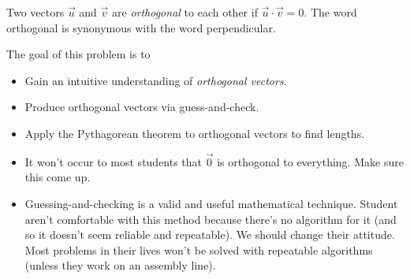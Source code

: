 \documentclass{problemset}
\begin{document}
	\begin{definition}[Orthogonal]
		Two vectors $\vec u$ and $\vec v$ are \emph{orthogonal} to each other
		if $\vec u\cdot \vec v=0$.  The word orthogonal is synonymous with the
		word perpendicular.
	\end{definition}


	\question
	\begin{annotation}
		\begin{goals}

			The goal of this problem is to
			\begin{itemize}
				\item Gain an intuitive understanding of \emph{orthogonal vectors}.
				\item Produce orthogonal vectors via guess-and-check.
				\item Apply the Pythagorean theorem to orthogonal vectors to find lengths.
			\end{itemize}
		\end{goals}

		\begin{notes}
			\begin{itemize}
				\item It won't occur to most students that $\vec 0$ is orthogonal to everything. Make sure
					this come up.
				\item Guessing-and-checking is a valid and useful mathematical technique. Student aren't
					comfortable with this method because there's no algorithm for it (and so it
					doesn't seem reliable and repeatable). We should change their attitude. Most problems
					in their lives won't be solved with repeatable algorithms (unless they work on
					an assembly line).
			\end{itemize}
		\end{notes}
	\end{annotation}
\end{document}
